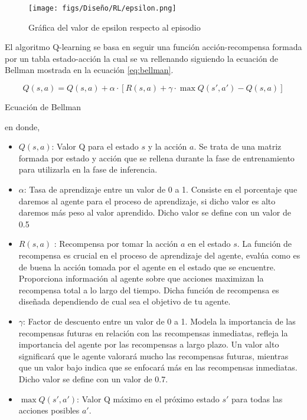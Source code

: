 \begin{itemize}
 \begin{figure} [H]
  \begin{center}
    \texttt{[image: figs/Diseño/RL/epsilon.png]}
  \end{center}
  \caption{Gráfica del valor de epsilon respecto al episodio}
  \label{fig:epsilon}
  \vspace{-1.5em}
\end{figure}
  \end{itemize}

  El algoritmo Q-learning se basa en seguir una función acción-recompensa formada por un tabla estado-acción la cual se va rellenando siguiendo la ecuación
  de Bellman\cite{Bellman} mostrada en la ecuación \ref{eq:bellman}.
  \begin{myequation}[ht]
    \begin{equation}
      Q(s, a) = Q(s, a) + \alpha \cdot [R(s, a) + \gamma \cdot \max Q(s', a') - Q(s, a)]
      \label{eq:bellman}
    \end{equation}
    \caption{Ecuación de Bellman}
  \end{myequation}
  en donde, 
  \begin{itemize}
    \item \textbf{$Q(s, a)$}: Valor Q para el estado $s$ y la acción $a$. Se trata de una matriz formada por estado y acción que se rellena durante la fase de entrenamiento para utilizarla
    en la fase de inferencia.
    \item \textbf{$\alpha$}: Tasa de aprendizaje entre un valor de 0 a 1. Consiste en el porcentaje que daremos al agente para el proceso de aprendizaje, 
    si dicho valor es alto daremos más peso al valor aprendido. Dicho valor se define con un valor de 0.5 
    \item \textbf{$R(s, a)$ }: Recompensa por tomar la acción $a$ en el estado $s$. La función de recompensa es crucial en el proceso de aprendizaje del agente, 
    evalúa como es de buena la acción tomada por el agente en el estado que se encuentre. Proporciona información al agente sobre que acciones maximizan la recompensa total a lo largo del tiempo. Dicha función
    de recompensa es diseñada dependiendo de cual sea el objetivo de tu agente. 
    \item \textbf{$\gamma$}: Factor de descuento entre un valor de 0 a 1. Modela la importancia de las recompensas futuras en relación con las recompensas inmediatas, refleja la importancia del agente
    por las recompensas a largo plazo. Un valor alto significará que le agente valorará mucho las recompensas futuras, mientras que un valor bajo indica que se enfocará más en las recompensas
    inmediatas. Dicho valor se define con un valor de 0.7.
    \item \textbf{$\max Q(s', a')$}: Valor Q máximo en el próximo estado $s'$ para todas las acciones posibles $a'$.
\end{itemize}

